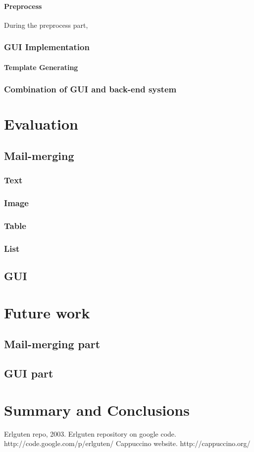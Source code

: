 \documentclass{report}
\begin{document}
\subsubsection{Preprocess}

  During the preprocess part, 

\subsection{GUI Implementation}
\subsubsection{Template Generating}
\subsection{Combination of GUI and back-end system}

\chapter{Evaluation}
\section{Mail-merging}
\subsection{Text}
\subsection{Image}
\subsection{Table}
\subsection{List}
\section{GUI}

\chapter{Future work}
\section{Mail-merging part}
\section{GUI part}

\chapter{Summary and Conclusions}

\begin{thebibliography}{9}
Erlguten repo, 2003. Erlguten repository on google code. http://code.google.com/p/erlguten/
 Cappuccino website. http://cappuccino.org/
\end{thebibliography}
\end{document}
